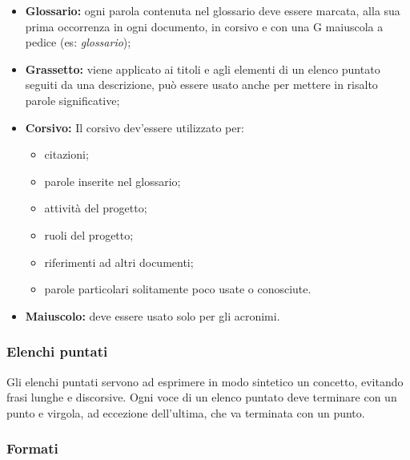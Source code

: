 \documentclass[NormediProgetto.tex]{subfiles}
\begin{document}
\begin{itemize}

\item{\textbf{Glossario:}} ogni parola contenuta nel glossario deve essere marcata, alla sua prima occorrenza in ogni documento, in corsivo e con una G maiuscola a pedice (es: \textit{glossario});  

\item{\textbf{Grassetto:}} viene applicato ai titoli e agli elementi di un elenco puntato seguiti da una descrizione, può essere usato anche per mettere in risalto parole significative; 

\item{\textbf{Corsivo:}} Il corsivo dev’essere utilizzato per:
\begin{itemize}
\item citazioni;
\item parole inserite nel glossario;
\item attività del progetto;
\item ruoli del progetto;
\item riferimenti ad altri documenti;
\item parole particolari solitamente poco usate o conosciute.
\end{itemize}

\item{\textbf{Maiuscolo:}} deve essere usato solo per gli acronimi.

\end{itemize}

\subsubsection{Elenchi puntati}

 Gli elenchi puntati servono ad esprimere in modo sintetico un concetto, evitando frasi lunghe e discorsive. Ogni voce di un elenco puntato deve terminare con un punto e virgola, ad eccezione dell’ultima, che va terminata con un punto.

\subsubsection{Formati}
\end{document}
